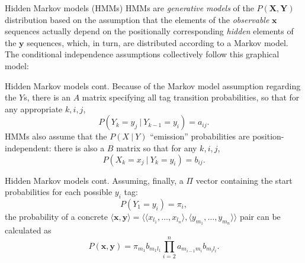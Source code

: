 \documentclass[style=upen, size=14pt]{powerdot}
\newcommand{\gold}{\color{arany}}
\theoremstyle{definition}
\begin{document}
  \begin{slide}[toc=HMMs]{Hidden Markov models (HMMs)}
    HMMs are \emph{generative models} of the $P(\mathbf{X}, \mathbf{Y})$
    distribution based on the assumption that the elements of the \emph{\gold
      observable} $\mathbf{x}$ sequences actually depend on the positionally
    corresponding \emph{\gold hidden} elements of the $\mathbf{y}$ sequences,
    which, in turn, are distributed according to a Markov model. The conditional
    independence assumptions collectively follow this graphical model:
    \begin{center}
    \end{center}
  \end{slide}

  \begin{slide}[toc=]{Hidden Markov models cont.}
    Because of the Markov model assumption regarding the $Y$s, there is an
    $A$ matrix specifying all tag
    transition probabilities, so that for any appropriate $k, i, j$,
    $$
    P(Y_k=y_j ~|~Y_{k-1}=y_i) = a_{i j}.
    $$
    HMMs also assume that the $P(X~|~Y)$ ``emission'' probabilities are
    position-independent: there is also a $B$ matrix so that for any
    $k, i, j$,
    $$
    P(X_k= x_j ~|~Y_{k}= y_i) = b_{i j}.
    $$
  \end{slide}

  \begin{slide}[toc=]{Hidden Markov models cont.}
    Assuming, finally, a $\Pi$ vector containing the start probabilities
    for each possible $y_i$ tag:
    $$
    P(Y_1 = y_i) = \pi_i,
    $$
    the probability of a concrete
    $\langle \mathbf{x}, \mathbf{y} \rangle =\langle \langle
    x_{l_1},\dots,x_{l_n} \rangle, \langle y_{m_1},\dots,y_{m_n} \rangle
    \rangle$ pair can be calculated as
    $$
    P(\mathbf{x}, \mathbf{y}) = \pi_{m_1} b_{m_1 l_1}
    \prod_{i=2}^na_{m_{i-1} m_i}b_{m_i l_i}.
    $$
  \end{slide}
\end{document}
